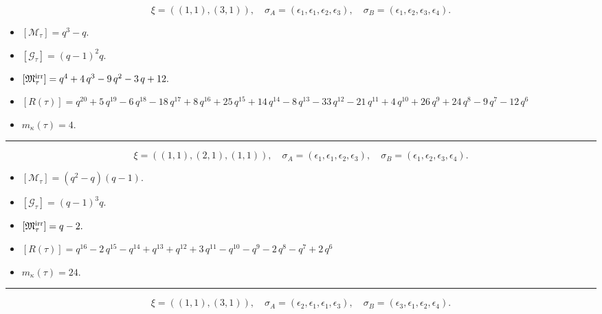 \documentclass[10pt,a4paper]{amsart}
\begin{document}
$$\xi = ({(1, 1)}, {(3, 1)}),\quad \sigma_A = ({{\epsilon_1}}, {{\epsilon_1, \epsilon_2, \epsilon_3}}),\quad \sigma_B = ({{\epsilon_1}}, {{\epsilon_2, \epsilon_3, \epsilon_4}}).$$

\begin{itemize}
 \item $[\mathcal{M}_{\tau}] = q^{3} - q .$

 \item $[\mathcal{G}_{\tau}] = {\left(q - 1\right)}^{2} q .$

 \item $[{\frak M}_{\tau}^{\textrm{irr}}] = q^{4} + 4 \, q^{3} - 9 \, q^{2} - 3 \, q + 12 .$

 \item $[R(\tau)] = q^{20} + 5 \, q^{19} - 6 \, q^{18} - 18 \, q^{17} + 8 \, q^{16} + 25 \, q^{15} + 14 \, q^{14} - 8 \, q^{13} - 33 \, q^{12} - 21 \, q^{11} + 4 \, q^{10} + 26 \, q^{9} + 24 \, q^{8} - 9 \, q^{7} - 12 \, q^{6} $

 \item $m_{\kappa}(\tau) = 4 .$

 \end{itemize}
\noindent\rule{8cm}{0.4pt}

$$\xi = ({(1, 1)}, {(2, 1), (1, 1)}),\quad \sigma_A = ({{\epsilon_1}}, {{\epsilon_1, \epsilon_2}, {\epsilon_3}}),\quad \sigma_B = ({{\epsilon_1}}, {{\epsilon_2, \epsilon_3}, {\epsilon_4}}).$$

\begin{itemize}
 \item $[\mathcal{M}_{\tau}] = {\left(q^{2} - q\right)} {\left(q - 1\right)} .$

 \item $[\mathcal{G}_{\tau}] = {\left(q - 1\right)}^{3} q .$

 \item $[{\frak M}_{\tau}^{\textrm{irr}}] = q - 2 .$

 \item $[R(\tau)] = q^{16} - 2 \, q^{15} - q^{14} + q^{13} + q^{12} + 3 \, q^{11} - q^{10} - q^{9} - 2 \, q^{8} - q^{7} + 2 \, q^{6} $

 \item $m_{\kappa}(\tau) = 24 .$

 \end{itemize}
\noindent\rule{8cm}{0.4pt}

$$\xi = ({(1, 1)}, {(3, 1)}),\quad \sigma_A = ({{\epsilon_2}}, {{\epsilon_1, \epsilon_1, \epsilon_3}}),\quad \sigma_B = ({{\epsilon_3}}, {{\epsilon_1, \epsilon_2, \epsilon_4}}).$$
\end{document}
